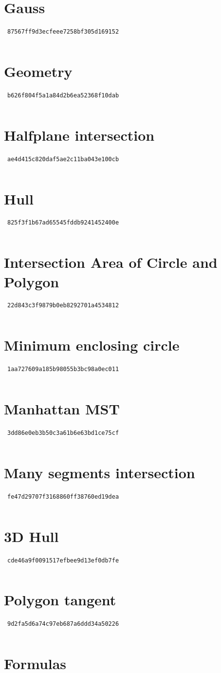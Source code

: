 \documentclass[10pt, a4paper]{amsart}
\newcommand{\includecpp}[3]{
    \section{#1}\
    {\footnotesize \texttt{#3} }\
    \inputminted{cpp}{#2}
}
\begin{document}
\begin{multicols}{2}
\includecpp{Gauss}{lib/math/Gauss.cpp}{87567ff9d3ecfeee7258bf305d169152}
\includecpp{Geometry}{lib/geometry/geometry.cpp}{b626f804f5a1a84d2b6ea52368f10dab}
\includecpp{Halfplane intersection}{lib/geometry/halfplane_adam.cpp}{ae4d415c820daf5ae2c11ba043e100cb}
\includecpp{Hull}{lib/geometry/ch_and_cht.cpp}{825f3f1b67ad65545fddb9241452400e}
\includecpp{Intersection Area of Circle and Polygon}{lib/geometry/circle_polygon_intersection.cpp}{22d843c3f9879b0eb8292701a4534812}
\includecpp{Minimum enclosing circle}{lib/geometry/enclosing_circle.cpp}{1aa727609a185b98055b3bc98a0ec011}
\includecpp{Manhattan MST}{lib/geometry/manhattan_mst.cpp}{3dd86e0eb3b50c3a61b6e63bd1ce75cf}
\includecpp{Many segments intersection}{lib/geometry/many_segments_intersection.cpp}{fe47d29707f3168860ff38760ed19dea}
\includecpp{3D Hull}{lib/geometry/3d_hull}{cde46a9f0091517efbee9d13ef0db7fe}
\includecpp{Polygon tangent}{lib/geometry/polygon_tangent.cpp}{9d2fa5d6a74c97eb687a6ddd34a50226}

\newpage
\section{Formulas}

\end{multicols}
\end{document}
